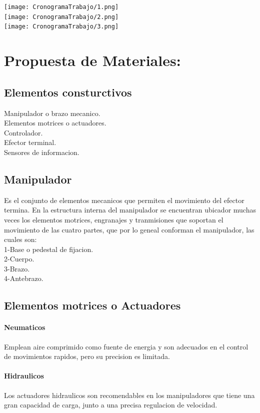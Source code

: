 \documentclass[14pt,a4paper]{article}
\begin{document}
\begin{center}
\texttt{[image: CronogramaTrabajo/1.png]}\\

\texttt{[image: CronogramaTrabajo/2.png]}\\

\texttt{[image: CronogramaTrabajo/3.png]}  
\end{center}
\newpage

\section{Propuesta de Materiales:}

\subsection{Elementos consturctivos}
Manipulador o brazo mecanico.\\
Elementos motrices o actuadores.\\
Controlador.\\
Efector terminal.\\
Sensores de informacion.

\subsection{Manipulador}
Es el conjunto de elementos mecanicos que permiten el movimiento del efector termina. En la estructura interna del manipulador se encuentran ubicador muchas veces los elementos motrices, engranajes y tranmisiones que soportan el movimiento de las cuatro partes, que por lo geneal conforman el manipulador, las cuales son:\\
1-Base o pedestal de fijacion.\\
2-Cuerpo.\\
3-Brazo.\\
4-Antebrazo.\\
\subsection{Elementos motrices o Actuadores}
\paragraph{Neumaticos}
Emplean aire comprimido como fuente de energia y son adecuados en el control de movimientos rapidos, pero su precision es limitada.
\paragraph{Hidraulicos}
Los actuadores hidraulicos son recomendables en los manipuladores que tiene una gran capacidad de carga, junto a una precisa regulacion de velocidad.
\end{document}
